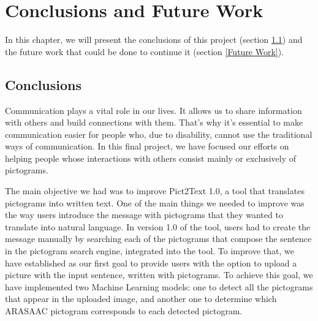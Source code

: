 
\chapter{Conclusions and Future Work}
\label{cap:conclusions}

In this chapter, we will present the conclusions of this project (section \ref{Conclusions}) and the future work that could be done to continue it (section \ref{Future Work}).

\section{Conclusions}
\label{Conclusions}

Communication plays a vital role in our lives. It allows us to share information with others and build connections with them. That's why it's essential to make communication easier for people who, due to disability, cannot use the traditional ways of communication. In this final project, we have focused our efforts on helping people whose interactions with others consist mainly or exclusively of pictograms. 

The main objective we had was to improve Pict2Text 1.0, a tool that translates pictograms into written text. One of the main things we needed to improve was the way users introduce the message with pictograms that they wanted to translate into natural language. In version 1.0 of the tool, users had to create the message manually by searching each of the pictograms that compose the sentence in the pictogram search engine, integrated into the tool. To improve that, we have established as our first goal to provide users with the option to upload a picture with the input sentence, written with pictograms. To achieve this goal, we have implemented two Machine Learning models: one to detect all the pictograms that appear in the uploaded image, and another one to determine which ARASAAC pictogram corresponds to each detected pictogram. 

